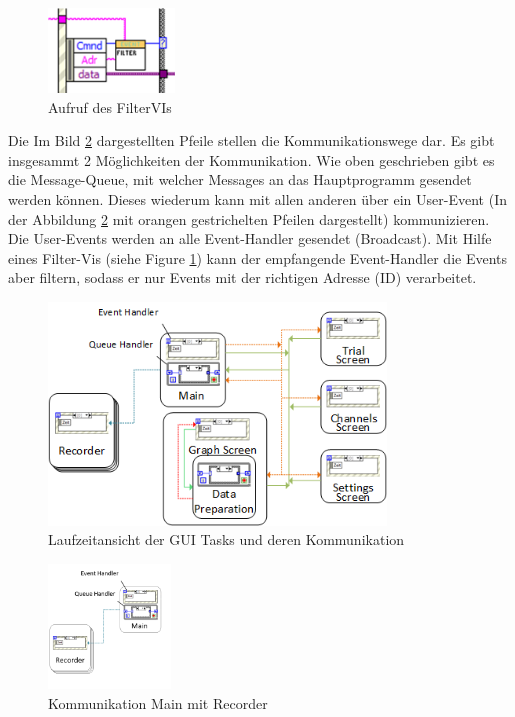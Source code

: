 \documentclass[10pt]{scrartcl}
\begin{document}
\begin{figure}
	\begin{center}
		\includegraphics[width=0.3\textwidth]{filterVI}
		\caption{Aufruf des FilterVIs}
		\label{fig:filterVI}
	\end{center}
\end{figure}
Die Im Bild \ref{fig:LaufzeitansichtUDA} dargestellten Pfeile stellen die Kommunikationswege dar. Es gibt insgesammt 2 Möglichkeiten der Kommunikation. Wie oben geschrieben gibt es die Message-Queue, mit welcher Messages an das Hauptprogramm gesendet werden können. Dieses wiederum kann mit allen anderen über ein User-Event (In der Abbildung \ref{fig:LaufzeitansichtUDA} mit orangen gestrichelten Pfeilen dargestellt) kommunizieren. Die User-Events werden an alle Event-Handler gesendet (Broadcast). Mit Hilfe eines Filter-Vis (siehe Figure \ref{fig:filterVI}) kann der empfangende Event-Handler die Events aber filtern, sodass er nur Events mit der richtigen Adresse (ID) verarbeitet.  \cite{tech:ftc} 

\begin{figure}[htbp]
	\centering
	\includegraphics[width=0.8\textwidth]{LaufzeitansichtMitRecorder}
	\caption{Laufzeitansicht der GUI Tasks und deren Kommunikation}
	\label{fig:LaufzeitansichtUDA}
\end{figure}
\newpage
\begin{figure}
	\begin{center}
		\includegraphics[width=0.29\textwidth]{LauftzeitansichtRecorderNah}
		\caption{Kommunikation Main mit Recorder}
		\label{fig:LauftzeitansichtRecorder}
	\end{center}
\end{figure}
\end{document}
